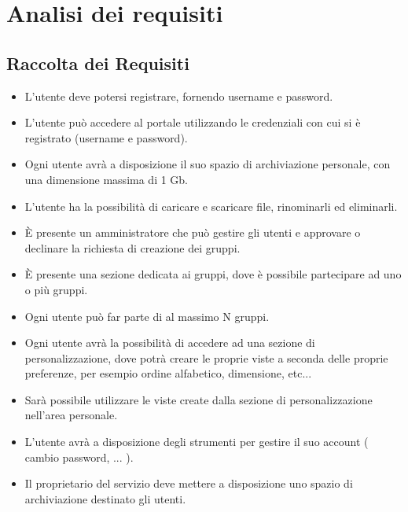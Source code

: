 \chapter*{Analisi dei requisiti}

\section*{Raccolta dei Requisiti}

\begin{itemize}

  \item L'utente deve potersi registrare, fornendo username e password.
  
  \item L'utente può accedere al portale utilizzando le credenziali con cui si è registrato (username e password).
  
  \item Ogni utente avrà a disposizione il suo spazio di archiviazione personale, con una dimensione massima di 1 Gb.
  
  \item L'utente ha la possibilità di caricare e scaricare file, rinominarli ed eliminarli.
  
  \item È presente un amministratore che può gestire gli utenti e approvare o declinare la richiesta di creazione dei gruppi.
  
  \item È presente una sezione dedicata ai gruppi, dove è possibile partecipare ad uno o più gruppi.
  
  \item Ogni utente può far parte di al massimo N gruppi.
  
  \item Ogni utente avrà la possibilità di accedere ad una sezione di
  personalizzazione, dove potrà creare le proprie viste a seconda delle proprie preferenze, per esempio ordine alfabetico, dimensione, etc...
  
  \item Sarà possibile utilizzare le viste create dalla sezione di personalizzazione nell'area personale.
  
  \item L'utente avrà a disposizione degli strumenti per gestire il suo account ( cambio password, ... ).
  
  \item Il proprietario del servizio deve mettere a disposizione uno spazio di archiviazione destinato gli utenti.
  
\end{itemize}

